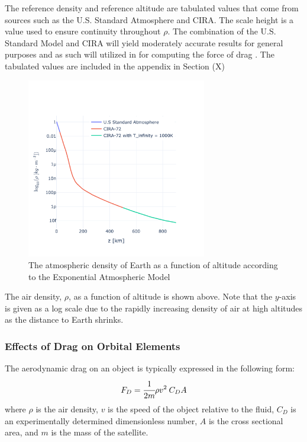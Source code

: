\documentclass[a4paper, 12pt]{article}
\begin{document}
The reference density and reference altitude are tabulated values that come from sources such as the U.S. Standard Atmosphere and CIRA. The scale height is a value used to ensure continuity throughout $\rho$. The combination of the U.S. Standard Model and CIRA will yield moderately accurate results for general purposes and as such will utilized in for computing the force of drag \citep{vallado_d._2013}. The tabulated values are included in the appendix in Section (X)

\begin{figure}[h]
	\centering     %
	\includegraphics[width=0.7\textwidth]{Atmospheric_Density_v_Altitude}
	\caption{The atmospheric density of Earth as a function of altitude according to the Exponential Atmospheric Model}
\end{figure}

The air density, $\rho$, as a function of altitude is shown above. Note that the $y$-axis is given as a log scale due to the rapidly increasing density of air at high altitudes as the distance to Earth shrinks.

\subsubsection{Effects of Drag on Orbital Elements}

The aerodynamic drag on an object is typically expressed in the following form:
\begin{equation}
	F_D = \cfrac{1}{2m} \rho v^2 \: C_D A
\end{equation}
where $\rho$ is the air density, $v$ is the speed of the object relative to the fluid, $C_D$ is an experimentally determined dimensionless number, $A$ is the cross sectional area, and $m$ is the mass of the satellite.
\end{document}
